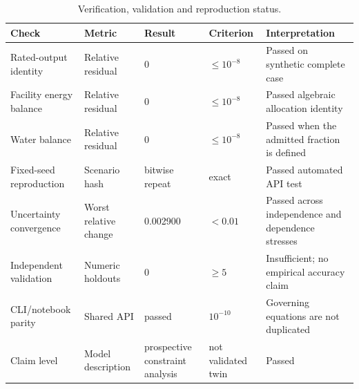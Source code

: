 \begin{table}[htbp]
\centering
\caption{Verification, validation and reproduction status.}
\label{tab:verification}
\small
\begin{tabularx}{\textwidth}{p{}p{}p{}p{}X}
\toprule
Check & Metric & Result & Criterion & Interpretation \\
\midrule
Rated-output identity & Relative residual & 0 & $\leq10^{-8}$ & Passed on synthetic complete case \\
Facility energy balance & Relative residual & 0 & $\leq10^{-8}$ & Passed algebraic allocation identity \\
Water balance & Relative residual & 0 & $\leq10^{-8}$ & Passed when the admitted fraction is defined \\
Fixed-seed reproduction & Scenario hash & bitwise repeat & exact & Passed automated API test \\
Uncertainty convergence & Worst relative change & 0.002900 & $<0.01$ & Passed across independence and dependence stresses \\
Independent validation & Numeric holdouts & 0 & $\geq5$ & Insufficient; no empirical accuracy claim \\
CLI/notebook parity & Shared API & passed & $10^{-10}$ & Governing equations are not duplicated \\
Claim level & Model description & prospective constraint analysis & not validated twin & Passed \\
\bottomrule
\end{tabularx}
\end{table}
